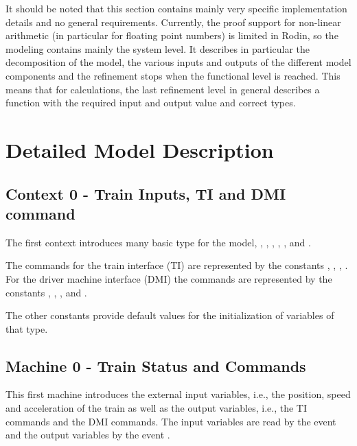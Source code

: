 \documentclass{template/openetcs_article}
\begin{document}
It should be noted that this section contains mainly very specific
implementation details and no general requirements. Currently, the proof support
for non-linear arithmetic (in particular for floating point numbers) is limited
in Rodin, so the modeling contains mainly the system level. It describes in
particular the decomposition of the model, the various inputs and outputs of the
different model components and the refinement stops when the functional level is
reached. This means that for calculations, the last refinement level in general
describes a function with the required input and output value and correct types.

\section{Detailed Model Description}
\label{sec:deta-model-descr}


\subsection{Context 0 - Train Inputs, TI and DMI command}
\label{sec:context-0-entities}

The first context introduces many basic type for the model,
, , ,
, ,  and
.

The commands for the train interface (TI) are represented by the constants
, , ,
. For the driver machine interface (DMI) the commands are
represented by the constants , ,
,  and .

The other constants provide default values for the initialization of variables
of that type.

{\footnotesize

}

\subsection{Machine 0 - Train Status and Commands}
\label{sec:machine-0-train}

This first machine introduces the external input variables, i.e., the position,
speed and acceleration of the train as well as the output variables, i.e., the
TI commands and the DMI commands. The input variables are read by the event
 and the output variables by the event
.
\end{document}
